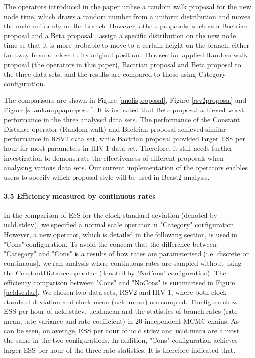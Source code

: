 \documentclass{bmcart}
\begin{document}
\begin{backmatter}
The operators introduced in the paper utilise a random walk proposal for the new node time, which draws a random number from a uniform distribution and moves the node uniformly on the branch. However, others proposals, such as a Bactrian proposal \cite{Yang19307} and a Beta proposal \cite{betaproposal}, assign a specific distribution on the new node time so that it is more probable to move to a certain height on the branch, either far away from or close to its original position. This section applied Random walk proposal (the operators in this paper), Bactrian proposal and Beta proposal to the three data sets, and the results are compared to those using Category configuration.

The comparisons are shown in Figure \ref{anolisproposal}, Figure \ref{rsv2proposal} and Figure \ref{shankarappaproposal}. It is indicated that Beta proposal achieved worst performance in the three analysed data sets. The performance of the Constant Distance operator (Random walk) and Bactrian proposal achieved similar performance in RSV2 data set, while Bactrian proposal provided larger ESS per hour for most parameters in HIV-1 data set. Therefore, it still needs further investigation to demonstrate the effectiveness of different proposals when analysing various data sets. Our current implementation of the operators enables users to specify which proposal style will be used in Beast2 analysis.

\paragraph*{3.5 Efficiency measured by continuous rates}

In the comparison of ESS for the clock standard deviation (denoted by ucld.stdev), we specified a normal scale operator in "Category" configuration. However, a new operator, which is detailed in the following section, is used in "Cons" configuration. To avoid the concern that the difference between "Category" and "Cons" is a results of how rates are parameterised (i.e. discrete or continuous), we ran analysis where continuous rates are sampled without using the ConstantDistance operator (denoted by "NoCons" configuration). The efficiency comparison between "Cons" and "NoCons" is summarised in Figure \ref{ucldscalar}. We chosen two data sets, RSV2 and HIV-1, where both clock standard deviation and clock mean (ucld.mean) are sampled. The figure shows ESS per hour of ucld.stdev, ucld.mean and the statistics of branch rates (rate mean, rate variance and rate coefficient) in 20 independent MCMC chains. As can be seen, on average, ESS per hour of ucld.stdev and ucld.mean are almost the same in the two configurations. In addition, "Cons" configuration achieves larger ESS per hour of the three rate statistics. It is therefore indicated that.



\end{backmatter}
\end{document}
